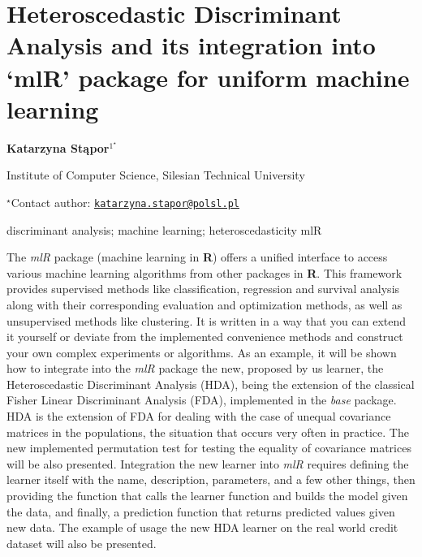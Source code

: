 \documentclass[\main/boa.tex]{subfiles}
\begin{document}
\section{Heteroscedastic Discriminant Analysis and its integration into `mlR'
package for uniform machine learning}

\begin{center}
  {\bf Katarzyna Stąpor$^{1^\star}$}
\end{center}

\vskip 0.3cm

\begin{affiliations}
\begin{enumerate}
\begin{minipage}{0.915\textwidth}
\centering
\item Institute of Computer Science, Silesian Technical University \\[-2pt]
\end{minipage}
\end{enumerate}
$^\star$Contact author: \href{mailto:katarzyna.stapor@polsl.pl}{\nolinkurl{katarzyna.stapor@polsl.pl}}\\
\end{affiliations}

\vskip 0.5cm

\begin{minipage}{0.915\textwidth}
\keywords discriminant analysis; machine learning; heteroscedasticity
\packages mlR
\end{minipage}

\vskip 0.8cm

The \emph{mlR} package (machine learning in \textbf{R}) offers a unified
interface to access various machine learning algorithms from other
packages in \textbf{R}. This framework provides supervised methods like
classification, regression and survival analysis along with their
corresponding evaluation and optimization methods, as well as
unsupervised methods like clustering. It is written in a way that you
can extend it yourself or deviate from the implemented convenience
methods and construct your own complex experiments or algorithms. As an
example, it will be shown how to integrate into the \emph{mlR} package
the new, proposed by us learner, the Heteroscedastic Discriminant
Analysis (HDA), being the extension of the classical Fisher Linear
Discriminant Analysis (FDA), implemented in the \emph{base} package. HDA
is the extension of FDA for dealing with the case of unequal covariance
matrices in the populations, the situation that occurs very often in
practice. The new implemented permutation test for testing the equality
of covariance matrices will be also presented. Integration the new
learner into \emph{mlR} requires defining the learner itself with the
name, description, parameters, and a few other things, then providing
the function that calls the learner function and builds the model given
the data, and finally, a prediction function that returns predicted
values given new data. The example of usage the new HDA learner on the
real world credit dataset will also be presented.
\end{document}

